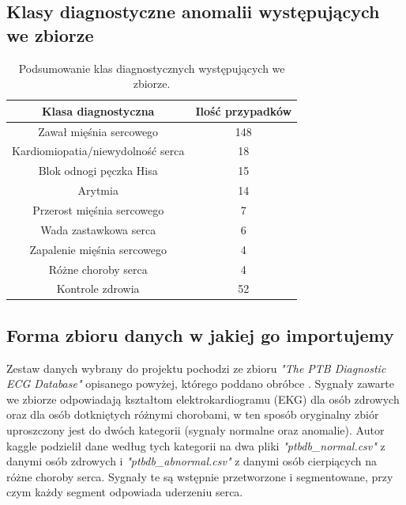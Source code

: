 \documentclass[12pt,a4paper]{article}
\begin{document}
\subsection{Klasy diagnostyczne anomalii występujących we zbiorze}

\begin{table}[H]
    \centering
    \begin{tabular}{|c|c|}
         \hline
         \textbf{Klasa diagnostyczna} & \textbf{Ilość przypadków} \\
         \hline
         Zawał mięśnia sercowego & 148 \\ 
         \hline
         Kardiomiopatia/niewydolność serca & 18 \\
         \hline
         Blok odnogi pęczka Hisa & 15 \\
         \hline
         Arytmia & 14 \\
         \hline
         Przerost mięśnia sercowego & 7 \\
         \hline
         Wada zastawkowa serca & 6 \\
         \hline
         Zapalenie mięśnia sercowego & 4 \\
         \hline
         Różne choroby serca & 4 \\
         \hline
         Kontrole zdrowia & 52 \\
         \hline
    \end{tabular}
    \caption{Podsumowanie klas diagnostycznych występujących we zbiorze.}
    \label{tab:anomalies_in_dataset}
\end{table}

\subsection{Forma zbioru danych w jakiej go importujemy}
Zestaw danych wybrany do projektu pochodzi ze zbioru \textit{"The PTB Diagnostic ECG Database"} opisanego powyżej, którego poddano obróbce \cite{ecg-heartbeat-categorization-dataset}. Sygnały zawarte we zbiorze odpowiadają kształtom elektrokardiogramu (EKG) dla osób zdrowych oraz dla osób dotkniętych różnymi chorobami, w ten sposób oryginalny zbiór uproszczony jest do dwóch kategorii (sygnały normalne oraz anomalie). Autor kaggle podzielił dane według tych kategorii na dwa pliki \textit{"ptbdb\_normal.csv"} z danymi osób zdrowych i \textit{"ptbdb\_abnormal.csv"} z danymi osób cierpiących na różne choroby serca. Sygnały te są wstępnie przetworzone i segmentowane, przy czym każdy segment odpowiada uderzeniu serca.
\end{document}
